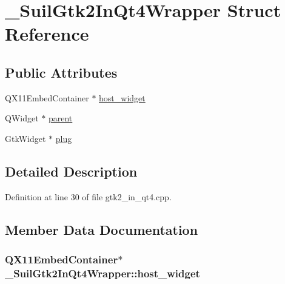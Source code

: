 \hypertarget{struct___suil_gtk2_in_qt4_wrapper}{}\section{\+\_\+\+Suil\+Gtk2\+In\+Qt4\+Wrapper Struct Reference}
\label{struct___suil_gtk2_in_qt4_wrapper}
\subsection*{Public Attributes}
\begin{DoxyCompactItemize}
\item 
Q\+X11\+Embed\+Container $\ast$ \hyperlink{struct___suil_gtk2_in_qt4_wrapper_ae9e83fe7857cd0bd48a4c5d471cdf0ff}{host\+\_\+widget}
\item 
Q\+Widget $\ast$ \hyperlink{struct___suil_gtk2_in_qt4_wrapper_a448695a80ce40daba01470f293183ccb}{parent}
\item 
Gtk\+Widget $\ast$ \hyperlink{struct___suil_gtk2_in_qt4_wrapper_aa84bf6ef59c71a1b03bca99ce7a3dac8}{plug}
\end{DoxyCompactItemize}


\subsection{Detailed Description}


Definition at line 30 of file gtk2\+\_\+in\+\_\+qt4.\+cpp.



\subsection{Member Data Documentation}
\subsubsection[{\texorpdfstring{host\+\_\+widget}{host_widget}}]{\setlength{\rightskip}{0pt plus 5cm}Q\+X11\+Embed\+Container$\ast$ \+\_\+\+Suil\+Gtk2\+In\+Qt4\+Wrapper\+::host\+\_\+widget}\hypertarget{struct___suil_gtk2_in_qt4_wrapper_ae9e83fe7857cd0bd48a4c5d471cdf0ff}{}\label{struct___suil_gtk2_in_qt4_wrapper_ae9e83fe7857cd0bd48a4c5d471cdf0ff}


